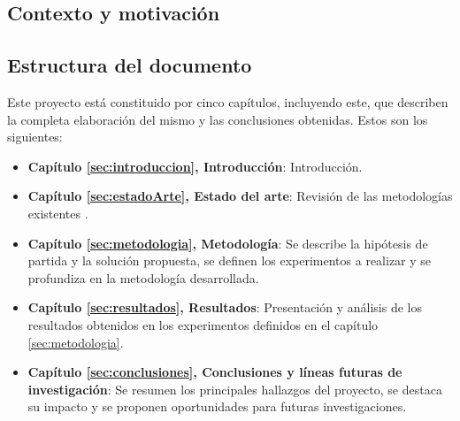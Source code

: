 \documentclass[../main.tex]{subfiles}
\begin{document}
\label{sec:introduccion}

\subsection{Contexto y motivación}
\label{sec:intro/motivacion}


\subsection{Estructura del documento}
\label{sec:intro/estructuraDoc}

Este proyecto está constituido por cinco capítulos, incluyendo este, que describen la completa elaboración del mismo y las conclusiones obtenidas. Estos son los siguientes:

\begin{itemize}
    \item \textbf{Capítulo \ref{sec:introduccion}, Introducción}: Introducción.
    \item \textbf{Capítulo \ref{sec:estadoArte}, Estado del arte}: Revisión de las metodologías existentes .
    \item \textbf{Capítulo \ref{sec:metodologia}, Metodología}: Se describe la hipótesis de partida y la solución propuesta, se definen los experimentos a realizar y se profundiza en la metodología desarrollada.
    \item \textbf{Capítulo \ref{sec:resultados}, Resultados}: Presentación y análisis de los resultados obtenidos en los experimentos definidos en el capítulo \ref{sec:metodologia}.
    \item \textbf{Capítulo \ref{sec:conclusiones}, Conclusiones y líneas futuras de investigación}: Se resumen los principales hallazgos del proyecto, se destaca su impacto y se proponen oportunidades para futuras investigaciones.
\end{itemize}
\end{document}
